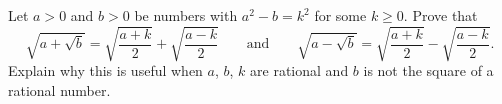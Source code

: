 Let $a>0$ and $b>0$ be numbers with $a^2-b=k^2$ for some $k\ge0$. Prove that
\[\sqrt{a+\sqrt b}=\sqrt{\dfrac{a+k}{2}}+\sqrt{\dfrac{a-k}{2}}\qquad\text{and}\qquad\sqrt{a-\sqrt b}=\sqrt{\dfrac{a+k}{2}}-\sqrt{\dfrac{a-k}{2}}.\]
Explain why this is useful when $a$, $b$, $k$ are rational and $b$ is not the square of a rational number.
